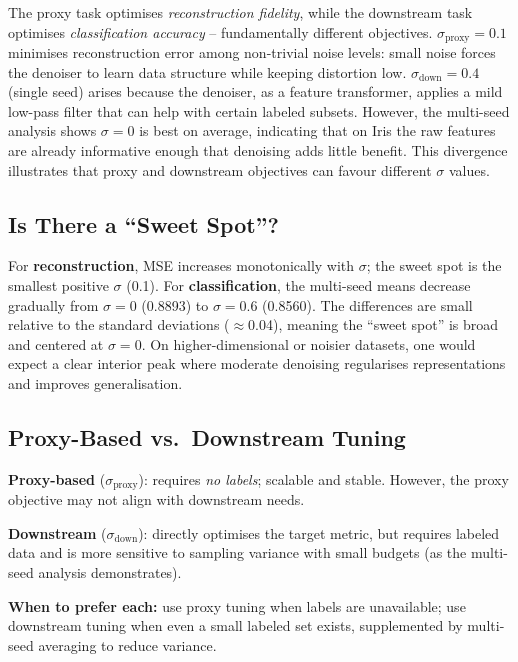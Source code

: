 \documentclass[10pt, letterpaper]{article}
\begin{document}
The proxy task optimises \emph{reconstruction fidelity}, while the downstream task optimises \emph{classification accuracy} -- fundamentally different objectives.
$\sigma_{\text{proxy}}{=}0.1$ minimises reconstruction error among non-trivial noise levels: small noise forces the denoiser to learn data structure while keeping distortion low.
$\sigma_{\text{down}}{=}0.4$ (single seed) arises because the denoiser, as a feature transformer, applies a mild low-pass filter that can help with certain labeled subsets. However, the multi-seed analysis shows $\sigma{=}0$ is best on average, indicating that on Iris the raw features are already informative enough that denoising adds little benefit.
This divergence illustrates that proxy and downstream objectives can favour different $\sigma$ values.

\subsection{Is There a ``Sweet Spot''?}

For \textbf{reconstruction}, MSE increases monotonically with $\sigma$; the sweet spot is the smallest positive $\sigma$ (0.1).
For \textbf{classification}, the multi-seed means decrease gradually from $\sigma{=}0$ (0.8893) to $\sigma{=}0.6$ (0.8560). The differences are small relative to the standard deviations ($\approx$0.04), meaning the ``sweet spot'' is broad and centered at $\sigma{=}0$. On higher-dimensional or noisier datasets, one would expect a clear interior peak where moderate denoising regularises representations and improves generalisation.

\subsection{Proxy-Based vs.\ Downstream Tuning}

\textbf{Proxy-based} ($\sigma_{\text{proxy}}$): requires \emph{no labels}; scalable and stable. However, the proxy objective may not align with downstream needs.

\textbf{Downstream} ($\sigma_{\text{down}}$): directly optimises the target metric, but requires labeled data and is more sensitive to sampling variance with small budgets (as the multi-seed analysis demonstrates).

\textbf{When to prefer each:} use proxy tuning when labels are unavailable; use downstream tuning when even a small labeled set exists, supplemented by multi-seed averaging to reduce variance.
\end{document}
